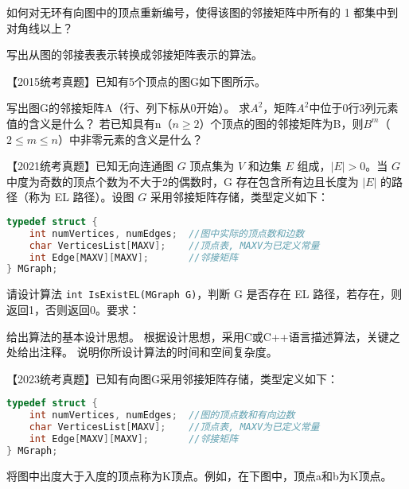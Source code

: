 \begin{qitems}
    \begin{bbox}
        \qitem 如何对无环有向图中的顶点重新编号，使得该图的邻接矩阵中所有的 1 都集中到对角线以上？
    \end{bbox}

    \begin{bbox}
        \qitem 写出从图的邻接表表示转换成邻接矩阵表示的算法。
    \end{bbox}

    \begin{bbox}
        \qitem 【2015统考真题】已知有5个顶点的图G如下图所示。
        \begin{subqitems}
            \subqitem 写出图G的邻接矩阵A（行、列下标从0开始）。
            \subqitem 求$A^2$，矩阵$A^2$中位于0行3列元素值的含义是什么？
            \subqitem 若已知具有n（$n \ge 2$）个顶点的图的邻接矩阵为B，则$B^m$（$2 \le m \le n$）中非零元素的含义是什么？
        \end{subqitems}
    \end{bbox}

    \begin{bbox}
        \qitem 【2021统考真题】已知无向连通图 $G$ 顶点集为 $V$ 和边集 $E$ 组成，$|E|>0$。当 $G$ 中度为奇数的顶点个数为不大于2的偶数时，G 存在包含所有边且长度为 $|E|$ 的路径（称为 EL 路径）。设图 $G$ 采用邻接矩阵存储，类型定义如下：
        \begin{lstlisting}[language=C, basicstyle=\ttfamily\small]
typedef struct {
    int numVertices, numEdges;  //图中实际的顶点数和边数
    char VerticesList[MAXV];    //顶点表, MAXV为已定义常量
    int Edge[MAXV][MAXV];       //邻接矩阵
} MGraph;
        \end{lstlisting}
        请设计算法 \lstinline{int IsExistEL(MGraph G)}，判断 G 是否存在 EL 路径，若存在，则返回1，否则返回0。要求：
        \begin{subqitems}
            \subqitem 给出算法的基本设计思想。
            \subqitem 根据设计思想，采用C或C++语言描述算法，关键之处给出注释。
            \subqitem 说明你所设计算法的时间和空间复杂度。
        \end{subqitems}
    \end{bbox}
 
    \begin{bbox}
            \qitem 【2023统考真题】已知有向图G采用邻接矩阵存储，类型定义如下：
            \begin{lstlisting}[language=C, basicstyle=\ttfamily\small]
typedef struct {
    int numVertices, numEdges;  //图的顶点数和有向边数
    char VerticesList[MAXV];    //顶点表, MAXV为已定义常量
    int Edge[MAXV][MAXV];       //邻接矩阵
} MGraph;
            \end{lstlisting}
            将图中出度大于入度的顶点称为K顶点。例如，在下图中，顶点a和b为K顶点。


\end{bbox}
\end{qitems}
